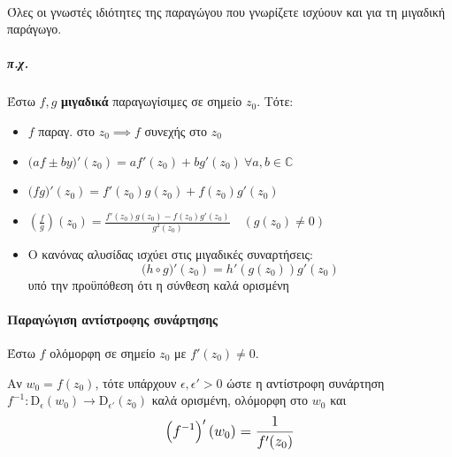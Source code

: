 \documentclass[12pt,a4paper,notitlepage,fleqn]{article}
\begin{document}
    \paragraph{}
    Όλες οι γνωστές ιδιότητες της παραγώγου που γνωρίζετε ισχύουν και για τη
    μιγαδική παράγωγο.
    \subparagraph{π.χ.}
    Έστω \( f,g \) \textbf{μιγαδικά} παραγωγίσιμες σε σημείο \( z_0 \). Τότε:
    \begin{itemize}
       	\item \( f \) παραγ. στο \( z_0 \implies f \) συνεχής στο \( z_0 \)
       	\item \( \big(af\pm by\big)'(z_0)=
       	af'(z_0)+bg'(z_0)\ \forall a,b\in\mathbb C  \)
       	\item \( \big(fg\big)'(z_0) = f'(z_0)g(z_0)+f(z_0)g'(z_0) \)
       	\item \(  \left(
       	\frac{f}{g} \right)(z_0)= \frac{f'(z_0)g(z_0)-f(z_0)g'(z_0)}{g^2(z_0)}
       	\quad \left(g(z_0)\neq0\right)
       	\)
       	\item Ο κανόνας αλυσίδας ισχύει στις μιγαδικές συναρτήσεις:
       	\[
       	\big( h\circ g \big)'(z_0)=h'\left( g(z_0) \right)g'(z_0)
       	\]
       	υπό την προϋπόθεση ότι η σύνθεση καλά ορισμένη
    \end{itemize}

    \paragraph{Παραγώγιση αντίστροφης συνάρτησης} %
    Έστω \( f \) ολόμορφη σε σημείο \( z_0 \) με \( f'(z_0)\neq 0 \).

    Αν \( w_0=f(z_0) \), τότε υπάρχουν \( \epsilon,\epsilon' >0 \) ώστε η
    αντίστροφη συνάρτηση \( f^{-1}:\mathrm D_\epsilon(w_0)
    \to\mathrm D_{\epsilon'}(z_0)
    \) καλά ορισμένη, ολόμορφη στο \( w_0 \) και
    \[
    \mathlarger{
       	\left( f^{-1} \right)'(w_0) = \frac{1}{f'(z_0)}
    }
    \]
\end{document}

